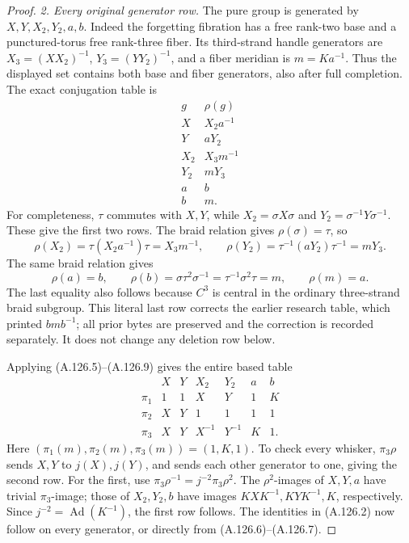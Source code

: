 \begin{proof}
\emph{2. Every original generator row.}
The pure group is generated by \(X,Y,X_2,Y_2,a,b\).
Indeed the forgetting fibration has a free rank-two base and a
punctured-torus free rank-three fiber. Its third-strand handle
generators are \(X_3=(XX_2)^{-1}\), \(Y_3=(YY_2)^{-1}\), and
a fiber meridian is \(m=Ka^{-1}\). Thus the displayed set contains
both base and fiber generators, also after full completion.
The exact conjugation table is
\[
\begin{array}{c|l}
 g&\rho(g)\\ \hline
 X&X_2a^{-1}\\
 Y&aY_2\\
 X_2&X_3m^{-1}\\
 Y_2&mY_3\\
 a&b\\
 b&m .
\end{array}                                                  \tag{A.126.8}
\]
For completeness, \(\tau\) commutes with \(X,Y\), while
\(X_2=\sigma X\sigma\) and \(Y_2=\sigma^{-1}Y\sigma^{-1}\).
These give the first two rows. The braid relation gives
\(\rho(\sigma)=\tau\), so
\[
 \rho(X_2)=\tau(X_2a^{-1})\tau=X_3m^{-1},\qquad
 \rho(Y_2)=\tau^{-1}(aY_2)\tau^{-1}=mY_3.
\]
The same braid relation gives
\[
 \rho(a)=b,\qquad
 \rho(b)=\sigma\tau^2\sigma^{-1}
        =\tau^{-1}\sigma^2\tau=m,\qquad \rho(m)=a.
                                                                  \tag{A.126.9}
\]
The last equality also follows because \(C^3\) is central in the
ordinary three-strand braid subgroup. This literal last row
corrects the earlier research table, which printed \(bmb^{-1}\);
all prior bytes are preserved and the correction is recorded
separately. It does not change any deletion row below.

Applying (A.126.5)--(A.126.9) gives the entire based table
\[
\begin{array}{c|rrrrrr}
 &X&Y&X_2&Y_2&a&b\\ \hline
 \pi_1&1&1&X&Y&1&K\\
 \pi_2&X&Y&1&1&1&1\\
 \pi_3&X&Y&X^{-1}&Y^{-1}&K&1 .
\end{array}                                                  \tag{A.126.10}
\]
Here \((\pi_1(m),\pi_2(m),\pi_3(m))=(1,K,1)\).
To check every whisker, \(\pi_3\rho\) sends \(X,Y\) to
\(j(X),j(Y)\), and sends each other generator to one, giving
the second row. For the first, use
\(\pi_3\rho^{-1}=j^{-2}\pi_3\rho^2\).
The \(\rho^2\)-images of \(X,Y,a\) have trivial \(\pi_3\)-image;
those of \(X_2,Y_2,b\) have images
\(KXK^{-1},KYK^{-1},K\), respectively. Since
\(j^{-2}=\operatorname{Ad}(K^{-1})\), the first row follows.
The identities in (A.126.2) now follow on every generator,
or directly from (A.126.6)--(A.126.7).


\end{proof}
